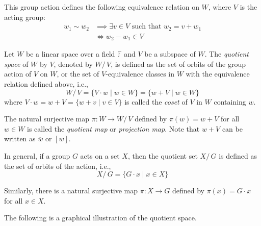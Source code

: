 \documentclass[
	11pt, %
	fleqn, %
	a4paper, %
]{LegrandOrangeBook}
\renewcommand{\bar}[1]{\overline{#1}} %
\newcommand{\quotient}[2]{#1 /\, #2} %
\newcommand{\F}{\mathbb{F}} %
\begin{document}
This group action defines the following equivalence relation on $W$, where $V$ is the acting group:
\[
    \begin{split}
        w_1 \sim w_2 & \implies \exists v \in V \text{ such that } w_2 = v + w_1 \\
        & \iff w_2 - w_1 \in V
    \end{split}
\]

\begin{definition}
    Let $W$ be a linear space over a field $\F$ and $V$ be a subspace of $W$. The \emph{quotient space} of $W$ by $V$, denoted by $\quotient{W}{V}$, is defined as the set of orbits of the group action of $V$ on $W$, or the set of $V$-equivalence classes in $W$ with the equivalence relation defined above, i.e.,
    \[
        \quotient{W}{V} = \{ V \cdot w \mid w \in W \} = \{ w + V \mid w \in W \}
    \]
    where $V \cdot w = w + V = \{ w + v \mid v \in V \}$ is called the \emph{coset} of $V$ in $W$ containing $w$.
\end{definition}

\begin{definition}
    The natural surjective map $\pi : W \to \quotient{W}{V}$ defined by $\pi(w) = w + V$ for all $w \in W$ is called the \emph{quotient map} or \emph{projection map}. Note that $w + V$ can be written as $\bar{w}$ or $[w]$.
\end{definition}

In general, if a group $G$ acts on a set $X$, then the quotient set $\quotient{X}{G}$ is defined as the set of orbits of the action, i.e.,
\[
    \quotient{X}{G} = \{ G \cdot x \mid x \in X \}
\]

Similarly, there is a natural surjective map $\pi : X \to G$ defined by $\pi(x) = G \cdot x$ for all $x \in X$.

The following is a graphical illustration of the quotient space.
\end{document}
